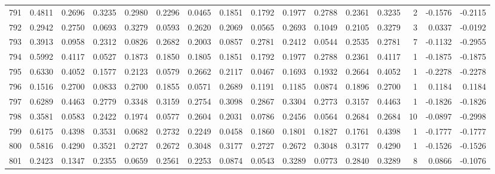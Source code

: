 \begin{tabular}{lrrrrrrrrrrrrrrr}
791 &      0.4811 &  0.2696 &  0.3235 &  0.2980 &  0.2296 &  0.0465 &  0.1851 &  0.1792 &  0.1977 &  0.2788 &   0.2361 &     0.3235 &      2 &                   -0.1576 &                    -0.2115 \\
792 &      0.2942 &  0.2750 &  0.0693 &  0.3279 &  0.0593 &  0.2620 &  0.2069 &  0.0565 &  0.2693 &  0.1049 &   0.2105 &     0.3279 &      3 &                    0.0337 &                    -0.0192 \\
793 &      0.3913 &  0.0958 &  0.2312 &  0.0826 &  0.2682 &  0.2003 &  0.0857 &  0.2781 &  0.2412 &  0.0544 &   0.2535 &     0.2781 &      7 &                   -0.1132 &                    -0.2955 \\
794 &      0.5992 &  0.4117 &  0.0527 &  0.1873 &  0.1850 &  0.1805 &  0.1851 &  0.1792 &  0.1977 &  0.2788 &   0.2361 &     0.4117 &      1 &                   -0.1875 &                    -0.1875 \\
795 &      0.6330 &  0.4052 &  0.1577 &  0.2123 &  0.0579 &  0.2662 &  0.2117 &  0.0467 &  0.1693 &  0.1932 &   0.2664 &     0.4052 &      1 &                   -0.2278 &                    -0.2278 \\
796 &      0.1516 &  0.2700 &  0.0833 &  0.2700 &  0.1855 &  0.0571 &  0.2689 &  0.1191 &  0.1185 &  0.0874 &   0.1896 &     0.2700 &      1 &                    0.1184 &                     0.1184 \\
797 &      0.6289 &  0.4463 &  0.2779 &  0.3348 &  0.3159 &  0.2754 &  0.3098 &  0.2867 &  0.3304 &  0.2773 &   0.3157 &     0.4463 &      1 &                   -0.1826 &                    -0.1826 \\
798 &      0.3581 &  0.0583 &  0.2422 &  0.1974 &  0.0577 &  0.2604 &  0.2031 &  0.0786 &  0.2456 &  0.0564 &   0.2684 &     0.2684 &     10 &                   -0.0897 &                    -0.2998 \\
799 &      0.6175 &  0.4398 &  0.3531 &  0.0682 &  0.2732 &  0.2249 &  0.0458 &  0.1860 &  0.1801 &  0.1827 &   0.1761 &     0.4398 &      1 &                   -0.1777 &                    -0.1777 \\
800 &      0.5816 &  0.4290 &  0.3521 &  0.2727 &  0.2672 &  0.3048 &  0.3177 &  0.2727 &  0.2672 &  0.3048 &   0.3177 &     0.4290 &      1 &                   -0.1526 &                    -0.1526 \\
801 &      0.2423 &  0.1347 &  0.2355 &  0.0659 &  0.2561 &  0.2253 &  0.0874 &  0.0543 &  0.3289 &  0.0773 &   0.2840 &     0.3289 &      8 &                    0.0866 &                    -0.1076 \\

\end{tabular}
